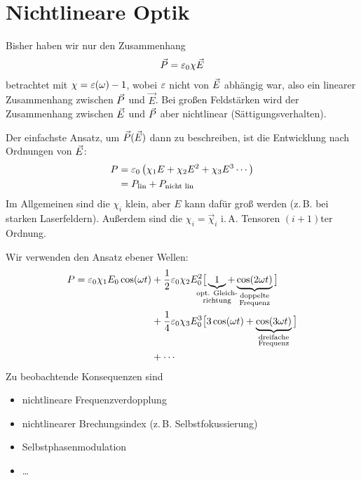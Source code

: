 
\chapter{Nichtlineare Optik}

Bisher haben wir nur den Zusammenhang
\begin{gather*}
  \vec{P} = \varepsilon_0\chi\vec{E}
\end{gather*}
betrachtet mit $\chi=\varepsilon(\omega)-1$, wobei $\varepsilon$ nicht von $\vec{E}$
abhängig war, also ein linearer Zusammenhang zwischen $\vec{P} $ und
$\vec E$.
Bei großen Feldstärken wird der Zusammenhang zwischen $\vec{E} $ und
$\vec{P} $ aber nichtlinear (Sättigungsverhalten).

Der einfachste Ansatz, um $\vec{P}(\vec{E})$ dann zu beschreiben, ist die
Entwicklung nach Ordnungen von $\vec{E} $:
\begin{align*}
  P &= \varepsilon_0 \left(
      \chi_1 E + \chi_2 E^2 + \chi_3 E^3 \dotsb
      \right) \\
    &= P_\text{lin} + P_\text{nicht lin}
\end{align*}
Im Allgemeinen sind die $\chi_i$ klein, aber $E$ kann dafür groß werden
(z.\,B. bei starken Laserfeldern).
Außerdem sind die $\chi_i=\vec{\chi}_i$ i.\,A. Tensoren $(i+1)$ter
Ordnung.

Wir verwenden den Ansatz ebener Wellen:
\begin{align*}
  P = \epso \chi_1 E_0\cos(\omega t) 
  &+ \frac{1}{2}\epso\chi_2 E_0^2 \big[ 
    \underbrace{1}_{\mathclap{\substack{\text{opt. Gleich-}\\\text{richtung}}}} +
  \underbrace{\cos(2\omega t)}_{\substack{\text{doppelte}\\ \text{Frequenz}}}
  \big]\\
  &+ \frac{1}{4}\epso\chi_3 E_0^3 \big[
    3\cos(\omega t) + 
    \underbrace{\cos(3\omega t)}_{\substack{\text{dreifache}\\\text{Frequenz}}}
  \big]\\
  &+ \dotsb
\end{align*}
Zu beobachtende Konsequenzen sind
\begin{itemize}
\item nichtlineare Frequenzverdopplung
\item nichtlinearer Brechungsindex (z.\,B. Selbstfokussierung)
\item Selbstphasenmodulation
\item \dots
\end{itemize}


